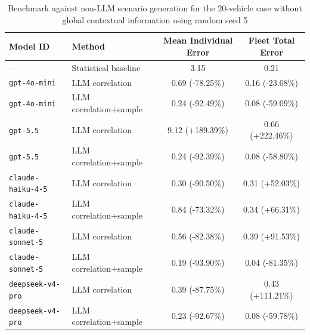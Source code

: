 \begin{table}[ht]
\centering
\caption{Benchmark against non-LLM scenario generation for the 20-vehicle case without global contextual information using random seed 5}
\label{tab:llm-api-benchmark-no-global-seed-5}
\begin{tabular}{l l c c}
\hline
\textbf{Model ID} & \textbf{Method} & \textbf{Mean Individual Error} & \textbf{Fleet Total Error} \\
\hline
-- & Statistical baseline & 3.15 & 0.21 \\
\hline
\texttt{gpt-4o-mini} & LLM correlation & 0.69 (-78.25\%) & 0.16 (-23.08\%) \\
\texttt{gpt-4o-mini} & LLM correlation+sample & 0.24 (-92.49\%) & 0.08 (-59.09\%) \\
\hline
\texttt{gpt-5.5} & LLM correlation & 9.12 (+189.39\%) & 0.66 (+222.46\%) \\
\texttt{gpt-5.5} & LLM correlation+sample & 0.24 (-92.39\%) & 0.08 (-58.80\%) \\
\hline
\texttt{claude-haiku-4-5} & LLM correlation & 0.30 (-90.50\%) & 0.31 (+52.03\%) \\
\texttt{claude-haiku-4-5} & LLM correlation+sample & 0.84 (-73.32\%) & 0.34 (+66.31\%) \\
\hline
\texttt{claude-sonnet-5} & LLM correlation & 0.56 (-82.38\%) & 0.39 (+91.53\%) \\
\texttt{claude-sonnet-5} & LLM correlation+sample & 0.19 (-93.90\%) & 0.04 (-81.35\%) \\
\hline
\texttt{deepseek-v4-pro} & LLM correlation & 0.39 (-87.75\%) & 0.43 (+111.21\%) \\
\texttt{deepseek-v4-pro} & LLM correlation+sample & 0.23 (-92.67\%) & 0.08 (-59.78\%) \\
\hline
\end{tabular}
\end{table}
